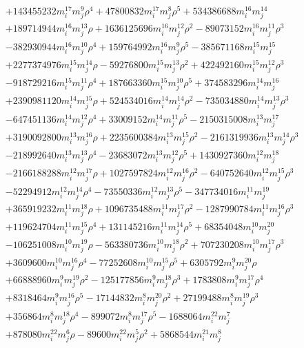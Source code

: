 {\begin{align*}
&+143455232m_i^{17}m_j^{9}\rho^{4}+47800832m_i^{17}m_j^{8}\rho^{5}+534386688m_i^{16}m_j^{14}\\
&+189714944m_i^{16}m_j^{13}\rho+1636125696m_i^{16}m_j^{12}\rho^{2}-89073152m_i^{16}m_j^{11}\rho^{3}\\
&-382930944m_i^{16}m_j^{10}\rho^{4}+159764992m_i^{16}m_j^{9}\rho^{5}-385671168m_i^{15}m_j^{15}\\
&+2277374976m_i^{15}m_j^{14}\rho-59276800m_i^{15}m_j^{13}\rho^{2}+422492160m_i^{15}m_j^{12}\rho^{3}\\
&-918729216m_i^{15}m_j^{11}\rho^{4}+187663360m_i^{15}m_j^{10}\rho^{5}+374583296m_i^{14}m_j^{16}\\
&+2390981120m_i^{14}m_j^{15}\rho+524534016m_i^{14}m_j^{14}\rho^{2}-735034880m_i^{14}m_j^{13}\rho^{3}\\
&-647451136m_i^{14}m_j^{12}\rho^{4}+33009152m_i^{14}m_j^{11}\rho^{5}-2150315008m_i^{13}m_j^{17}\\
&+3190092800m_i^{13}m_j^{16}\rho+2235600384m_i^{13}m_j^{15}\rho^{2}-2161319936m_i^{13}m_j^{14}\rho^{3}\\
&-218992640m_i^{13}m_j^{13}\rho^{4}-23683072m_i^{13}m_j^{12}\rho^{5}+1430927360m_i^{12}m_j^{18}\\
&-2166188288m_i^{12}m_j^{17}\rho+1027597824m_i^{12}m_j^{16}\rho^{2}-640752640m_i^{12}m_j^{15}\rho^{3}\\
&-52294912m_i^{12}m_j^{14}\rho^{4}-73550336m_i^{12}m_j^{13}\rho^{5}-347734016m_i^{11}m_j^{19}\\
&+365919232m_i^{11}m_j^{18}\rho+1096735488m_i^{11}m_j^{17}\rho^{2}-1287990784m_i^{11}m_j^{16}\rho^{3}\\
&+119624704m_i^{11}m_j^{15}\rho^{4}+131145216m_i^{11}m_j^{14}\rho^{5}+68354048m_i^{10}m_j^{20}\\
&-106251008m_i^{10}m_j^{19}\rho-563380736m_i^{10}m_j^{18}\rho^{2}+707230208m_i^{10}m_j^{17}\rho^{3}\\
&+3609600m_i^{10}m_j^{16}\rho^{4}-77252608m_i^{10}m_j^{15}\rho^{5}+6305792m_i^{9}m_j^{20}\rho\\
&+66888960m_i^{9}m_j^{19}\rho^{2}-125177856m_i^{9}m_j^{18}\rho^{3}+1783808m_i^{9}m_j^{17}\rho^{4}\\
&+8318464m_i^{9}m_j^{16}\rho^{5}-17144832m_i^{8}m_j^{20}\rho^{2}+27199488m_i^{8}m_j^{19}\rho^{3}\\
&+356864m_i^{8}m_j^{18}\rho^{4}-899072m_i^{8}m_j^{17}\rho^{5}-1688064m_i^{22}m_j^{7}\\
&+878080m_i^{22}m_j^{6}\rho-89600m_i^{22}m_j^{5}\rho^{2}+5868544m_i^{21}m_j^{8}\\

\end{align*}}
